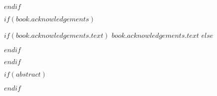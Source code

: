 $endif$

$if(book.acknowledgements)$

\begin{acknowledgements}
\begin{singlespace}

\setlength\parindent{0pt}

\addchaptertocentry{\acknowledgementname} %
$if(book.acknowledgements.text)$
$book.acknowledgements.text$
$else$

$endif$
\end{singlespace}
\end{acknowledgements}

$endif$

$if(abstract)$

\begin{abstract}
\begin{singlespace}

\setlength\parindent{0pt}

\addchaptertocentry{\abstractname} %
{$abstract$}\vspace{0.3cm}

{Palabras clave: }{\keywordnames}%
\end{singlespace}
\end{abstract}

$endif$




% 
\tableofcontents %

\listoffigures %

% 

